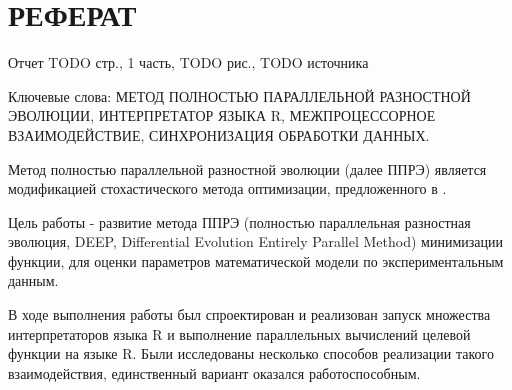 \chapter*{РЕФЕРАТ}

Отчет TODO стр., 1 часть, TODO рис., TODO источника

Ключевые слова: МЕТОД ПОЛНОСТЬЮ ПАРАЛЛЕЛЬНОЙ РАЗНОСТНОЙ ЭВОЛЮЦИИ, ИНТЕРПРЕТАТОР ЯЗЫКА R, МЕЖПРОЦЕССОРНОЕ ВЗАИМОДЕЙСТВИЕ, СИНХРОНИЗАЦИЯ ОБРАБОТКИ ДАННЫХ.

Метод полностью параллельной разностной эволюции (далее ППРЭ) \cite{Kozlov11, Kozlov13} является модификацией стохастического метода оптимизации, предложенного в \cite{Storn95}.

Цель работы - развитие метода ППРЭ (полностью параллельная разностная эволюция, DEEP, Differential Evolution Entirely Parallel Method) минимизации функции, для оценки параметров математической модели по экспериментальным данным.

В ходе выполнения работы был спроектирован и реализован запуск множества интерпретаторов языка R и выполнение параллельных вычислений целевой функции на языке R. Были исследованы несколько способов реализации такого взаимодействия, единственный вариант оказался работоспособным.
